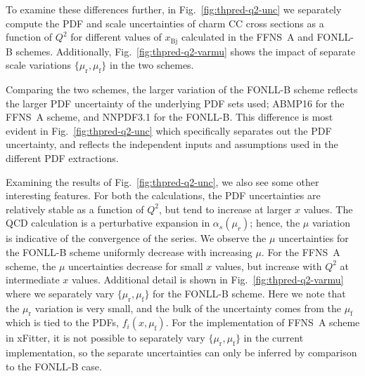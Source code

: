 \documentclass[pdftex,twocolumn,epjc3]{svjour3}          %
\newcommand{\xbj}{\ensuremath{x_{\text{Bj}}}\xspace}
\newcommand{\fonll} {{FONLL-B}\xspace}
\newcommand{\ffns} {{FFNS~A}\xspace}
\begin{document}
To examine these differences further, in Fig.~\ref{fig:thpred-q2-unc}
we separately compute the PDF and scale uncertainties of charm CC
cross sections as a function of $Q^2$ for different values of \xbj
calculated in the \ffns and \fonll schemes.
%
Additionally, Fig.~\ref{fig:thpred-q2-varmu} shows the impact of
separate scale variations $\{\mu_\mathrm{r} , \mu_\mathrm{f}\}$ in the
two schemes.


Comparing the two schemes, the larger variation of the  \fonll scheme
reflects the larger PDF uncertainty of the underlying PDF sets used;
ABMP16 for the  \ffns scheme, and NNPDF3.1 for the  \fonll.
%
This difference is most evident in  Fig.~\ref{fig:thpred-q2-unc} which
specifically separates out the PDF uncertainty, and  reflects
the independent inputs and assumptions used in the different  PDF extractions. 

Examining the results of Fig.~\ref{fig:thpred-q2-unc}, we also see
some other interesting features.
%
For both the calculations, the 
PDF uncertainties are relatively stable as a function of $Q^2$, but
tend to increase at larger $x$ values.
%
The QCD calculation is a perturbative expansion in $\alpha_s(\mu_r)$;
hence, the  $\mu$ variation
is indicative of the convergence of the series. 
%
We observe 
the $\mu$ uncertainties for the  \fonll scheme uniformly decrease with increasing $\mu$.
%
For the  \ffns scheme, the $\mu$ uncertainties decrease for small $x$ values,
but increase with $Q^2$ at intermediate $x$ values.
%
Additional detail is shown in  Fig.~\ref{fig:thpred-q2-varmu}
where we separately vary $\{\mu_\mathrm{r} , \mu_\mathrm{f}\}$
for the  \fonll scheme.
Here we note that the $\mu_\mathrm{r}$ variation is very small,
and the bulk  of the uncertainty comes from the  $\mu_\mathrm{f}$ which is tied to the
PDFs, $f_i(x,\mu_\mathrm{f})$.
%
For the implementation of \ffns scheme in xFitter, it is not possible to  separately vary $\{\mu_\mathrm{r} , \mu_\mathrm{f}\}$
in the current implementation, so  the separate uncertainties can only be inferred
by comparison to the \fonll case. 
\end{document}
